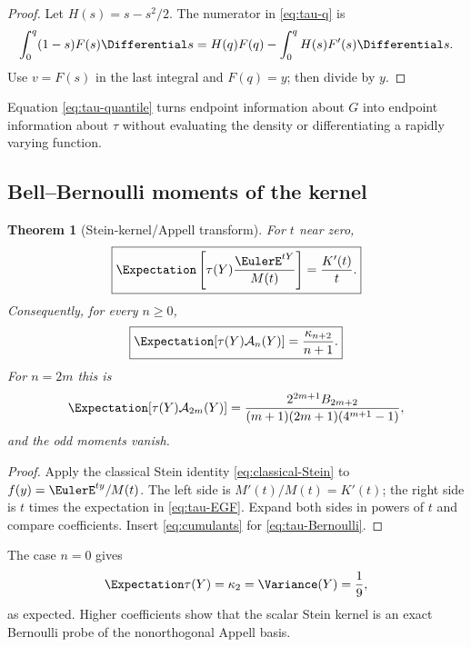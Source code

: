 \documentclass[11pt,a4paper]{article}
\newtheorem{theorem}{Theorem}[section]
\theoremstyle{definition}
\theoremstyle{remark}
\newcommand{\Acal}{\mathcal A}
\begin{document}
\begin{proof}
Let $H(s)=s-s^2/2$. The numerator in \eqref{eq:tau-q} is
\[
 \int_0^q(1-s)F(s)\Differential s
 =H(q)F(q)-\int_0^qH(s)F'(s)\Differential s.
\]
Use $v=F(s)$ in the last integral and $F(q)=y$; then divide by $y$.
\end{proof}

Equation \eqref{eq:tau-quantile} turns endpoint information about $G$ into endpoint information about $\tau$ without evaluating the density or differentiating a rapidly varying function.

\subsection{Bell--Bernoulli moments of the kernel}

\begin{theorem}[Stein-kernel/Appell transform]
\label{thm:tau-Appell}
For $t$ near zero,
\begin{equation}
 \boxed{\displaystyle
 \Expectation\left[\tau(Y)\frac{\EulerE^{tY}}{M(t)}\right]
 =\frac{K'(t)}t.}
 \label{eq:tau-EGF}
\end{equation}
Consequently, for every $n\ge0$,
\begin{equation}
 \boxed{\displaystyle
 \Expectation[\tau(Y)\Acal_n(Y)]
 =\frac{\kappa_{n+2}}{n+1}.}
 \label{eq:tau-Appell-moment}
\end{equation}
For $n=2m$ this is
\begin{equation}
 \Expectation[\tau(Y)\Acal_{2m}(Y)]
 =\frac{2^{2m+1}B_{2m+2}}
 {(m+1)(2m+1)(4^{m+1}-1)},
 \label{eq:tau-Bernoulli}
\end{equation}
and the odd moments vanish.
\end{theorem}

\begin{proof}
Apply the classical Stein identity \eqref{eq:classical-Stein} to $f(y)=\EulerE^{ty}/M(t)$. The left side is $M'(t)/M(t)=K'(t)$; the right side is $t$ times the expectation in \eqref{eq:tau-EGF}. Expand both sides in powers of $t$ and compare coefficients. Insert \eqref{eq:cumulants} for \eqref{eq:tau-Bernoulli}.
\end{proof}

The case $n=0$ gives
\begin{equation}
 \Expectation\tau(Y)=\kappa_2=\Variance(Y)=\frac19,
 \label{eq:mean-tau}
\end{equation}
as expected. Higher coefficients show that the scalar Stein kernel is an exact Bernoulli probe of the nonorthogonal Appell basis.
\end{document}
